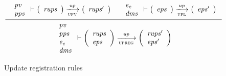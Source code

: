 \begin{figure}[htb]
  \begin{equation}
    \label{eq:rule:up-registration}
    \inference
    {
      {
        \begin{array}{l}
          \var{pv}\\
          \var{pps}
        \end{array}
      }
      \vdash
      {
        \left(
          \begin{array}{l}
            \var{rups}\\
          \end{array}
        \right)
      }
      \trans{upv}{\var{up}}
      {
        \left(
          \begin{array}{l}
            \var{rups'}\\
          \end{array}
        \right)
      }
      &
      {\begin{array}{l}
          \var{e_c}\\
          \var{dms}
        \end{array}
      }
      \vdash
      {
        \left(
          \begin{array}{l}
            \var{eps}
          \end{array}
        \right)
      }
      \trans{upl}{\var{up}}
      {
        \left(
          \begin{array}{l}
            \var{eps'}
          \end{array}
        \right)
      }
    }
    {
      {
        \begin{array}{l}
          \var{pv}\\
          \var{pps}\\
          \var{e_c}\\
          \var{dms}
        \end{array}
      }
      \vdash
      {
        \left(
          \begin{array}{l}
            \var{rups}\\
            \var{eps}
          \end{array}
        \right)
      }
      \trans{upreg}{\var{up}}
      {
        \left(
          \begin{array}{l}
            \var{rups'}\\
            \var{eps'}
          \end{array}
        \right)
      }
    }
  \end{equation}
  \caption{Update registration rules}
  \label{fig:rules:up-registration}
\end{figure}


